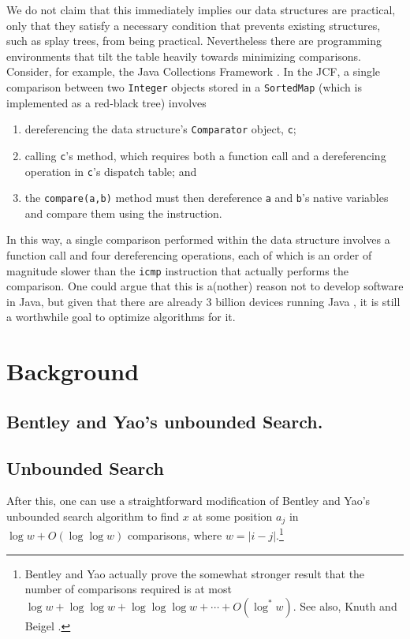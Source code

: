 \documentclass{patmorin}
\begin{document}
We do not claim that this immediately implies our data structures
are practical, only that they satisfy a necessary condition
that prevents existing structures, such as splay trees, from being
practical. Nevertheless there are programming environments that tilt the
table heavily towards minimizing comparisons.  Consider, for example, the
Java Collections Framework \cite{jcf}.  In the JCF, a single comparison
between two \texttt{Integer} objects stored in a \texttt{SortedMap}
(which is implemented as a red-black tree) involves
\begin{enumerate}
\item dereferencing the data structure's \texttt{Comparator} object, \texttt{c};
\item calling \texttt{c}'s  method, which requires both a function call and a dereferencing operation in \texttt{c}'s dispatch table; and
\item the \texttt{compare(a,b)} method must then dereference \texttt{a} and \texttt{b}'s native variables and compare them using the  instruction.
\end{enumerate}
In this way, a single comparison performed within the data structure
involves a function call and four dereferencing operations, each of which
is an order of magnitude slower than the \texttt{icmp} instruction that
actually performs the comparison.  One could argue that this is a(nother)
reason not to develop software in Java, but given that there are already
3 billion devices running Java \cite{www.java.com/en/about}, it is still
a worthwhile goal to optimize algorithms for it.

\section{Background}

\subsection{Bentley and Yao's unbounded Search.}

\subsection{Unbounded Search}

\begin{thm}
After this, one can use a straightforward modification of Bentley
and Yao's unbounded search algorithm \cite{byXX,kXX,xxx} to find $x$
at some position $a_j$ in $\log w + O(\log\log w)$ comparisons, where
$w=|i-j|$.\footnote{Bentley and Yao actually prove the somewhat stronger
result that the number of comparisons required is at most $\log w +
\log\log w + \log\log\log w +\cdots + O(\log^* w)$.  See also, Knuth
\cite{kXX} and Beigel \cite{bXX}.}
\end{thm}
\end{document}
